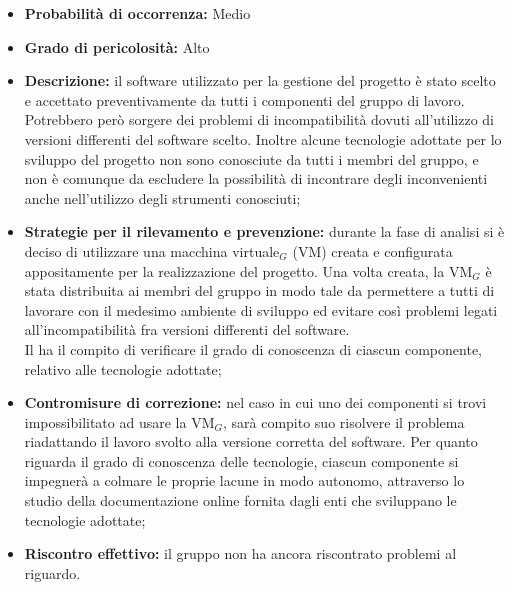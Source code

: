 \begin{itemize}
\item \textbf{Probabilità di occorrenza:} Medio
\item \textbf{Grado di pericolosità:} Alto
\item \textbf{Descrizione:} il software utilizzato per la gestione del progetto è stato scelto e accettato preventivamente da tutti i componenti del gruppo di lavoro. Potrebbero però sorgere dei problemi di incompatibilità dovuti all'utilizzo di versioni differenti del software scelto. Inoltre alcune tecnologie adottate per lo sviluppo del progetto non sono conosciute da tutti i membri del gruppo, e non è comunque da escludere la possibilità di incontrare degli inconvenienti anche nell'utilizzo degli strumenti conosciuti;

\item \textbf{Strategie per il rilevamento e prevenzione:} durante la fase di analisi si è deciso di utilizzare una macchina virtuale$_G$ (VM) creata e configurata appositamente per la realizzazione del progetto. Una volta creata, la VM$_G$ è stata distribuita ai membri del gruppo in modo tale da permettere a tutti di lavorare con il medesimo ambiente di sviluppo ed evitare così problemi legati all'incompatibilità fra versioni differenti del software. \\
Il \ruoloResponsabile{} ha il compito di verificare il grado di conoscenza di ciascun componente, relativo alle tecnologie adottate;
 
\item \textbf{Contromisure di correzione:} nel caso in cui uno dei componenti si trovi impossibilitato ad usare la VM$_G$, sarà compito suo risolvere il problema riadattando il lavoro svolto alla versione corretta del software.
Per quanto riguarda il grado di conoscenza delle tecnologie, ciascun componente si impegnerà a colmare le proprie lacune in modo autonomo, attraverso lo studio della documentazione online fornita dagli enti che sviluppano le tecnologie adottate;

\item \textbf{Riscontro effettivo:} il gruppo non ha ancora riscontrato problemi al riguardo.
\end{itemize}


